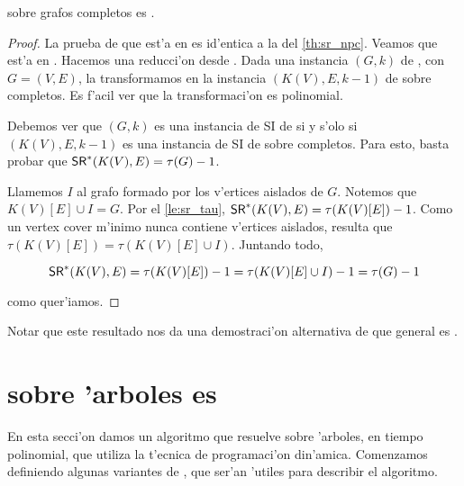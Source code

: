 \begin{theorem}
 sobre grafos completos es .

\begin{proof}
La prueba de que est'a en  es id'entica a la del \autoref{th:sr_npc}. Veamos que est'a en . Hacemos una reducci'on desde . Dada una instancia $(G, k)$ de , con $G = (V, E)$, la transformamos en la instancia $(K(V), E, k - 1)$ de  sobre completos. Es f'acil ver que la transformaci'on es polinomial.

Debemos ver que $(G, k)$ es una instancia de SI de  si y s'olo si $(K(V), E, k - 1)$ es una instancia de SI de  sobre completos. Para esto, basta probar que $\textnormal{\textsf{SR}}^*(K(V), E) = \tau(G) - 1$.

Llamemos $I$ al grafo formado por los v'ertices aislados de $G$. Notemos que $K(V)[E] \cup I = G$. Por el \autoref{le:sr_tau}, $\textnormal{\textsf{SR}}^*(K(V), E) = \tau(K(V)[E]) - 1$. Como un vertex cover m'inimo nunca contiene v'ertices aislados, resulta que $\tau(K(V)[E]) = \tau(K(V)[E] \cup I)$. Juntando todo,

\[\textnormal{\textsf{SR}}^*(K(V), E) = \tau(K(V)[E]) - 1 = \tau(K(V)[E] \cup I) - 1 = \tau(G) - 1\]

\noindent
como quer'iamos.
\end{proof}
\end{theorem}

Notar que este resultado nos da una demostraci'on alternativa de que  general es .

\section{ sobre 'arboles es }

En esta secci'on damos un algoritmo que resuelve  sobre 'arboles, en tiempo polinomial, que utiliza la t'ecnica de programaci'on din'amica. Comenzamos definiendo algunas variantes de , que ser'an 'utiles para describir el algoritmo.




